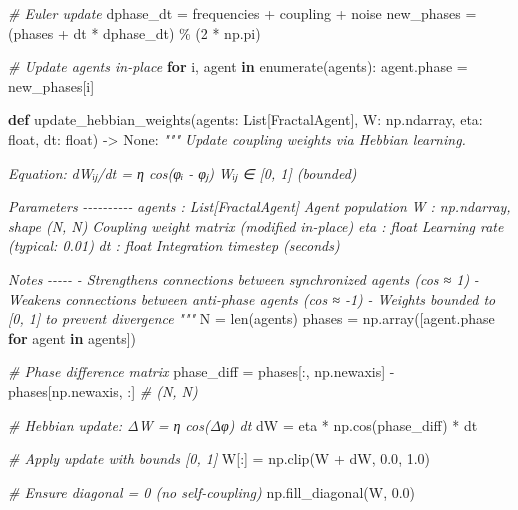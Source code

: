 \documentclass[
]{article}
\newenvironment{Shaded}{}{}
\newcommand{\BuiltInTok}[1]{\textcolor[rgb]{0.00,0.50,0.00}{#1}}
\newcommand{\CommentTok}[1]{\textcolor[rgb]{0.38,0.63,0.69}{\textit{#1}}}
\newcommand{\ControlFlowTok}[1]{\textcolor[rgb]{0.00,0.44,0.13}{\textbf{#1}}}
\newcommand{\DecValTok}[1]{\textcolor[rgb]{0.25,0.63,0.44}{#1}}
\newcommand{\FloatTok}[1]{\textcolor[rgb]{0.25,0.63,0.44}{#1}}
\newcommand{\KeywordTok}[1]{\textcolor[rgb]{0.00,0.44,0.13}{\textbf{#1}}}
\newcommand{\NormalTok}[1]{#1}
\newcommand{\OperatorTok}[1]{\textcolor[rgb]{0.40,0.40,0.40}{#1}}
\newcommand{\VariableTok}[1]{\textcolor[rgb]{0.10,0.09,0.49}{#1}}
\begin{document}
\begin{Shaded}
\begin{Highlighting}[]
    \CommentTok{\# Euler update}
\NormalTok{    dphase\_dt }\OperatorTok{=}\NormalTok{ frequencies }\OperatorTok{+}\NormalTok{ coupling }\OperatorTok{+}\NormalTok{ noise}
\NormalTok{    new\_phases }\OperatorTok{=}\NormalTok{ (phases }\OperatorTok{+}\NormalTok{ dt }\OperatorTok{*}\NormalTok{ dphase\_dt) }\OperatorTok{\%}\NormalTok{ (}\DecValTok{2} \OperatorTok{*}\NormalTok{ np.pi)}

    \CommentTok{\# Update agents in{-}place}
    \ControlFlowTok{for}\NormalTok{ i, agent }\KeywordTok{in} \BuiltInTok{enumerate}\NormalTok{(agents):}
\NormalTok{        agent.phase }\OperatorTok{=}\NormalTok{ new\_phases[i]}


\KeywordTok{def}\NormalTok{ update\_hebbian\_weights(agents: List[FractalAgent],}
\NormalTok{                          W: np.ndarray,}
\NormalTok{                          eta: }\BuiltInTok{float}\NormalTok{,}
\NormalTok{                          dt: }\BuiltInTok{float}\NormalTok{) }\OperatorTok{{-}\textgreater{}} \VariableTok{None}\NormalTok{:}
    \CommentTok{"""}
\CommentTok{    Update coupling weights via Hebbian learning.}

\CommentTok{    Equation:}
\CommentTok{        dWᵢⱼ/dt = η cos(φᵢ {-} φⱼ)}
\CommentTok{        Wᵢⱼ ∈ [0, 1] (bounded)}

\CommentTok{    Parameters}
\CommentTok{    {-}{-}{-}{-}{-}{-}{-}{-}{-}{-}}
\CommentTok{    agents : List[FractalAgent]}
\CommentTok{        Agent population}
\CommentTok{    W : np.ndarray, shape (N, N)}
\CommentTok{        Coupling weight matrix (modified in{-}place)}
\CommentTok{    eta : float}
\CommentTok{        Learning rate (typical: 0.01)}
\CommentTok{    dt : float}
\CommentTok{        Integration timestep (seconds)}

\CommentTok{    Notes}
\CommentTok{    {-}{-}{-}{-}{-}}
\CommentTok{    {-} Strengthens connections between synchronized agents (cos ≈ 1)}
\CommentTok{    {-} Weakens connections between anti{-}phase agents (cos ≈ {-}1)}
\CommentTok{    {-} Weights bounded to [0, 1] to prevent divergence}
\CommentTok{    """}
\NormalTok{    N }\OperatorTok{=} \BuiltInTok{len}\NormalTok{(agents)}
\NormalTok{    phases }\OperatorTok{=}\NormalTok{ np.array([agent.phase }\ControlFlowTok{for}\NormalTok{ agent }\KeywordTok{in}\NormalTok{ agents])}

    \CommentTok{\# Phase difference matrix}
\NormalTok{    phase\_diff }\OperatorTok{=}\NormalTok{ phases[:, np.newaxis] }\OperatorTok{{-}}\NormalTok{ phases[np.newaxis, :]  }\CommentTok{\# (N, N)}

    \CommentTok{\# Hebbian update: ΔW = η cos(Δφ) dt}
\NormalTok{    dW }\OperatorTok{=}\NormalTok{ eta }\OperatorTok{*}\NormalTok{ np.cos(phase\_diff) }\OperatorTok{*}\NormalTok{ dt}

    \CommentTok{\# Apply update with bounds [0, 1]}
\NormalTok{    W[:] }\OperatorTok{=}\NormalTok{ np.clip(W }\OperatorTok{+}\NormalTok{ dW, }\FloatTok{0.0}\NormalTok{, }\FloatTok{1.0}\NormalTok{)}

    \CommentTok{\# Ensure diagonal = 0 (no self{-}coupling)}
\NormalTok{    np.fill\_diagonal(W, }\FloatTok{0.0}\NormalTok{)}
\end{Highlighting}
\end{Shaded}
\end{document}
